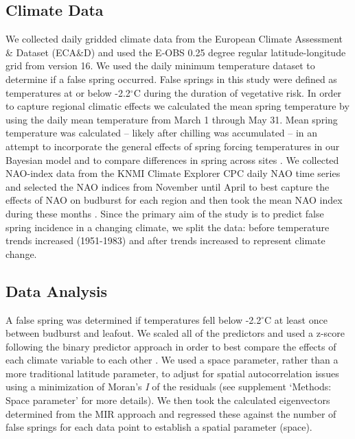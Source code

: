 \documentclass{article}\usepackage[]{graphicx}\usepackage[]{color}
\begin{document}
\subsection*{Climate Data}
We collected daily gridded climate data from the European Climate Assessment \& Dataset (ECA\&D) and used the E-OBS 0.25 degree regular latitude-longitude grid from version 16. We used the daily minimum temperature dataset to determine if a false spring occurred. False springs in this study were defined as temperatures at or below -2.2$^{\circ}$C \citep{Schwartz1993} during the duration of vegetative risk. In order to capture regional climatic effects we calculated the mean spring temperature by using the daily mean temperature from March 1 through May 31. Mean spring temperature was calculated -- likely after chilling was accumulated -- in an attempt to incorporate the general effects of spring forcing temperatures in our Bayesian model and to compare differences in spring across sites \citep{Basler2012, Korner2016}. We collected NAO-index data from the KNMI Climate Explorer CPC daily NAO time series and selected the NAO indices from November until April to best capture the effects of NAO on budburst for each region and then took the mean NAO index during these months \citep{NAOdata}. Since the primary aim of the study is to predict false spring incidence in a changing climate, we split the data: before temperature trends increased (1951-1983) and after trends increased \citep[1984-2016,][]{Kharouba2018, Stocker2013} to represent climate change.

\subsection*{Data Analysis}
A false spring was determined if temperatures fell below -2.2$^{\circ}$C at least once between budburst and leafout. We scaled all of the predictors and used a z-score following the binary predictor approach in order to best compare the effects of each climate variable to each other \citep{Gelman2006}. We used a space parameter, rather than a more traditional latitude parameter, to adjust for spatial autocorrelation issues using a minimization of Moran's \textit{I} of the residuals \citep{Baumen2017} (see supplement `Methods: Space parameter' for more details). We then took the calculated eigenvectors determined from the MIR approach and regressed these against the number of false springs for each data point to establish a spatial parameter (space). %
\end{document}
